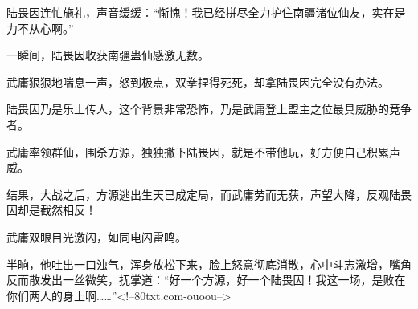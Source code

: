\begin{this_body}
陆畏因连忙施礼，声音缓缓：“惭愧！我已经拼尽全力护住南疆诸位仙友，实在是力不从心啊。”

一瞬间，陆畏因收获南疆蛊仙感激无数。

武庸狠狠地喘息一声，怒到极点，双拳捏得死死，却拿陆畏因完全没有办法。

陆畏因乃是乐土传人，这个背景非常恐怖，乃是武庸登上盟主之位最具威胁的竞争者。

武庸率领群仙，围杀方源，独独撇下陆畏因，就是不带他玩，好方便自己积累声威。

结果，大战之后，方源逃出生天已成定局，而武庸劳而无获，声望大降，反观陆畏因却是截然相反！

武庸双眼目光激闪，如同电闪雷鸣。

半晌，他吐出一口浊气，浑身放松下来，脸上怒意彻底消散，心中斗志激增，嘴角反而散发出一丝微笑，抚掌道：“好一个方源，好一个陆畏因！我这一场，是败在你们两人的身上啊……”<!--80txt.com-ouoou-->

\end{this_body}

